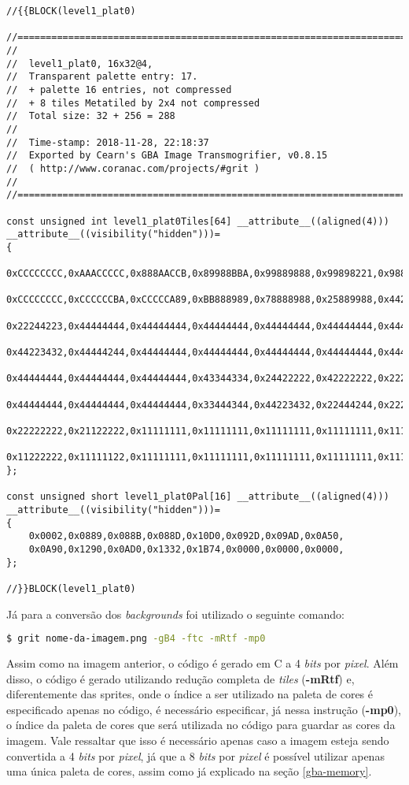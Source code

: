 \begin{lstlisting}[caption={\textit{Código fonte} da parte superior da imagem da plataforma da primeira fase.},label={lst:imagecpp}]
//{{BLOCK(level1_plat0)

//======================================================================
//
//  level1_plat0, 16x32@4,
//  Transparent palette entry: 17.
//  + palette 16 entries, not compressed
//  + 8 tiles Metatiled by 2x4 not compressed
//  Total size: 32 + 256 = 288
//
//  Time-stamp: 2018-11-28, 22:18:37
//  Exported by Cearn's GBA Image Transmogrifier, v0.8.15
//  ( http://www.coranac.com/projects/#grit )
//
//======================================================================

const unsigned int level1_plat0Tiles[64] __attribute__((aligned(4))) __attribute__((visibility("hidden")))=
{
    0xCCCCCCCC,0xAAACCCCC,0x888AACCB,0x89988BBA,0x99889888,0x99898221,0x98822222,0x81122444,
    0xCCCCCCCC,0xCCCCCCBA,0xCCCCCA89,0xBB888989,0x78888988,0x25889988,0x44225889,0x22444168,
    0x22244223,0x44444444,0x44444444,0x44444444,0x44444444,0x44444444,0x44444444,0x44444444,
    0x44223432,0x44444244,0x44444444,0x44444444,0x44444444,0x44444444,0x44444444,0x44444444,
    0x44444444,0x44444444,0x44444444,0x43344334,0x24422222,0x42222222,0x22222222,0x22222222,
    0x44444444,0x44444444,0x44444444,0x33444344,0x44223432,0x22444244,0x22222222,0x11222222,
    0x22222222,0x21122222,0x11111111,0x11111111,0x11111111,0x11111111,0x11111111,0x11111111,
    0x11222222,0x11111122,0x11111111,0x11111111,0x11111111,0x11111111,0x11111111,0x11111111,
};

const unsigned short level1_plat0Pal[16] __attribute__((aligned(4))) __attribute__((visibility("hidden")))=
{
    0x0002,0x0889,0x088B,0x088D,0x10D0,0x092D,0x09AD,0x0A50,
    0x0A90,0x1290,0x0AD0,0x1332,0x1B74,0x0000,0x0000,0x0000,
};

//}}BLOCK(level1_plat0)
\end{lstlisting}

Já para a conversão dos \textit{backgrounds} foi utilizado o seguinte comando:

\begin{lstlisting}[language=bash,caption={Comando para conversão dos \textit{backgrounds} em código}]
$ grit nome-da-imagem.png -gB4 -ftc -mRtf -mp0
\end{lstlisting}

Assim como na imagem anterior, o código é gerado em C a 4 \textit{bits} por \textit{pixel}. Além disso, o código é gerado utilizando redução completa de \textit{tiles} (\textbf{-mRtf}) e, diferentemente das sprites, onde o índice a ser utilizado na paleta de cores é especificado apenas no código, é necessário especificar, já nessa instrução (\textbf{-mp0}), o índice da paleta de cores que será utilizada no código para guardar as cores da imagem. Vale ressaltar que isso é necessário apenas caso a imagem esteja sendo convertida a 4 \textit{bits} por \textit{pixel}, já que a 8 \textit{bits} por \textit{pixel} é possível utilizar apenas uma única paleta de cores, assim como já explicado na seção \ref{gba-memory}.

